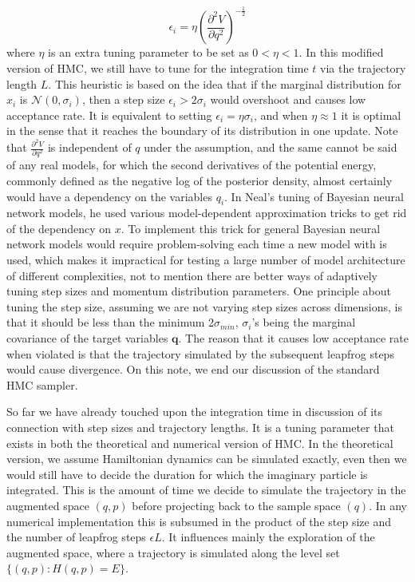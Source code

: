 \documentclass[]{report}
\begin{document}
\[ \epsilon_i  = \eta (\frac{\partial^2 V}{\partial q^2})^{-\frac{1}{2}}\]
where $\eta$ is an extra tuning parameter to be set as $0<\eta<1$. In this
modified version of HMC, we still have to tune for the integration time $t$ via
the trajectory length $L$. This heuristic is based on the idea that if the
marginal distribution for $x_i$ is $\mathcal{N}(0,\sigma_i)$, then a
step size $\epsilon_i > 2 \sigma_i$ would overshoot and causes low acceptance
rate. It is equivalent to setting $\epsilon_i = \eta \sigma_i$, and when $\eta
\approx 1$ it is optimal in the sense that it reaches the boundary of its
distribution in one update. Note that $  \frac{\partial^2 V}{\partial q^2}$ is
independent of $q$ under the assumption, and the same cannot be said of any real
models, for which the second derivatives of the potential energy, commonly
defined as the negative log of the posterior density, almost certainly would
have a dependency on the variables $q_i$. In Neal's tuning of Bayesian neural network models, he used
various model-dependent approximation tricks to get rid of the dependency on
$x$. To implement this trick for general Bayesian neural network models would require
problem-solving each time a new model with is used, which makes it impractical for
testing a large number of model architecture of different complexities, not to mention there are better ways of adaptively tuning
step sizes and momentum distribution parameters. One principle about tuning
the step size, assuming we are not varying step sizes across dimensions, is that it
should be less than the minimum 2$\sigma_{min}$, $\sigma_i$'s being the marginal
covariance of the target variables $\mathbf{q}$. The reason that it causes low
acceptance rate when violated is that the trajectory simulated by the subsequent
leapfrog steps would cause divergence. On this note, we end our discussion of the
standard HMC sampler.


So far we have already touched upon the integration time in discussion of
its connection with step sizes and trajectory lengths. It is a tuning parameter
that exists in both the theoretical and numerical version of HMC. In the
theoretical version, we assume Hamiltonian dynamics can be simulated exactly,
even then we would still have to decide the duration for which the imaginary
particle is integrated. This
is the amount of time we decide to simulate the trajectory in the augmented
space $(q,p)$ before projecting back to the sample space $(q)$. In any
numerical implementation this is subsumed in the product of the step size and the
number of leapfrog steps $\epsilon L$. It influences mainly the exploration of
the augmented space, where a trajectory is simulated along the level set
$\{(q,p):H(q,p)=E\}$.
\end{document}
